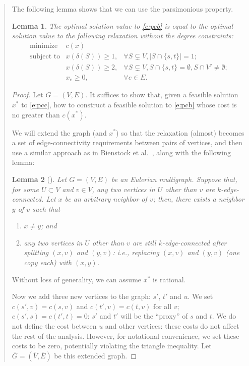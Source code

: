 \documentclass[11pt,letterpaper]{article}
\newtheorem{lemma}{Lemma}
\begin{document}
\begin{quote}
The following lemma shows that we can use the parsimonious property.

\begin{lemma}\label{l:pcpp}
The optimal solution value to \eqref{e:pcb} is equal to the optimal solution value to the following relaxation without the degree constraints:\begin{equation}\label{e:pcc}
\begin{array}{lll}
\textrm{minimize}&c(x)&\\
\textrm{subject to}&x(\delta(S))\geq 1,&\forall S\subsetneq V, |S\cap\{s,t\}|=1;\\
&x(\delta(S))\geq 2,&\forall S\subsetneq V, S\cap\{s,t\}=\emptyset, S\cap V'\neq\emptyset;\\
&x_e\geq 0,&\forall e\in E.
\end{array}
\end{equation}
\end{lemma}
\begin{proof}
Let $G=(V,E)$. It suffices to show that, given a feasible solution $x^*$ to \eqref{e:pcc}, how to construct a feasible solution to \eqref{e:pcb} whose cost is no greater than $c(x^*)$.

We will extend the graph (and $x^*$) so that the relaxation (almost) becomes a set of edge-connectivity requirements between pairs of vertices, and then use a similar approach as in Bienstock et al.~\cite{BGSW}, along with the following lemma:
\begin{lemma}[\cite{BGSW}]\label{l:pcsplit}
Let $G=(V,E)$ be an Eulerian multigraph. Suppose that, for some $U\subset V$ and $v\in V$, any two vertices in $U$ other than $v$ are $k$-edge-connected. Let $x$ be an arbitrary neighbor of $v$; then, there exists a neighbor $y$ of $v$ such that\begin{enumerate}
\item $x\neq y$; and
\item any two vertices in $U$ other than $v$ are still $k$-edge-connected after splitting $(x,v)$ and $(y,v)$: i.e., replacing $(x,v)$ and $(y,v)$ (one copy each) with $(x,y)$.
\end{enumerate}
\end{lemma}

Without loss of generality, we can assume $x^*$ is rational.

Now we add three new vertices to the graph: $s'$, $t'$ and $u$. We set $c(s',v)=c(s,v)$ and $c(t',v)=c(t,v)$ for all $v$; $c(s',s)=c(t',t)=0$: $s'$ and $t'$ will be the ``proxy'' of $s$ and $t$. We do not define the cost between $u$ and other vertices: these costs do not affect the rest of the analysis. However, for notational convenience, we set these costs to be zero, potentially violating the triangle inequality. Let $\bar G=(\bar V,\bar E)$ be this extended graph.


\end{proof}
\end{quote}
\end{document}

